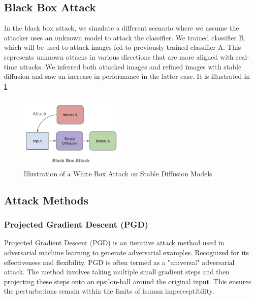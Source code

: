 \documentclass[letterpaper,twocolumn,10pt]{article}
\begin{document}
\subsection{Black Box Attack}
In the black box attack, we simulate a different scenario where we assume the attacker uses an unknown model to attack the classifier. We trained classifier B, which will be used to attack images fed to previously trained classifier A. This represents unknown attacks in various directions that are more aligned with real-time attacks. We inferred both attacked images and refined images with stable diffusion and saw an increase in performance in the latter case. It is illustrated in \ref{fig:bba}

\begin{figure}[htbp]
  \centering
  \includegraphics[width=0.45\textwidth]{bba.png}
  \caption{Illustration of a White Box Attack on Stable Diffusion Models}
  \label{fig:bba}
\end{figure}


\subsection{Attack Methods}
\subsubsection{Projected Gradient Descent (PGD)}

Projected Gradient Descent (PGD) is an iterative attack method used in adversarial machine learning to generate adversarial examples. Recognized for its effectiveness and flexibility, PGD is often termed as a "universal" adversarial attack. The method involves taking multiple small gradient steps and then projecting these steps onto an epsilon-ball around the original input. This ensures the perturbations remain within the limits of human imperceptibility.
\end{document}
